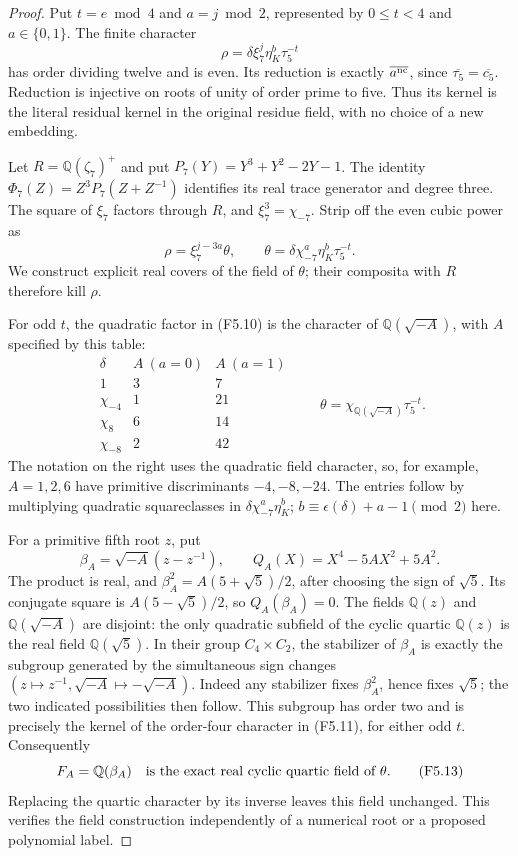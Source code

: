 \begin{proof}
Put $t=e\bmod4$ and $a=j\bmod2$, represented by
$0\leq t<4$ and $a\in\{0,1\}$. The finite character
\[
                 \rho=\delta\xi_7^j\eta_K^b\tau_5^{-t}
 \tag{F5.9}
\]
has order dividing twelve and is even. Its reduction is exactly
$\overline{a^{\rm nc}}$, since $\overline{\tau_5}=\overline{c_5}$.
Reduction is injective on roots of unity of order prime to five.
Thus its kernel is the literal residual kernel in the original
residue field, with no choice of a new embedding.

Let $R=\mathbb Q(\zeta_7)^+$ and put
$P_7(Y)=Y^3+Y^2-2Y-1$.
The identity $\Phi_7(Z)=Z^3P_7(Z+Z^{-1})$ identifies its
real trace generator and degree three. The square of $\xi_7$
factors through $R$, and $\xi_7^3=\chi_{-7}$.
Strip off the even cubic power as
\[
 \rho=\xi_7^{j-3a}\theta,\qquad
              \theta=\delta\chi_{-7}^{a}\eta_K^b\tau_5^{-t}.
 \tag{F5.10}
\]
We construct explicit real covers of the field of $\theta$;
their composita with $R$ therefore kill $\rho$.

For odd $t$, the quadratic factor in (F5.10) is the character
of $\mathbb Q(\sqrt{-A})$, with $A$ specified by this table:
\[
 \begin{array}{c|cc}
 \delta&A\ (a=0)&A\ (a=1)\\\hline
 1&3&7\\
 \chi_{-4}&1&21\\
 \chi_8&6&14\\
 \chi_{-8}&2&42
 \end{array}\qquad
                \theta=\chi_{\mathbb Q(\sqrt{-A})}\tau_5^{-t}.
 \tag{F5.11}
\]
The notation on the right uses the quadratic field character,
so, for example, $A=1,2,6$ have primitive discriminants
$-4,-8,-24$. The entries follow by multiplying quadratic
squareclasses in $\delta\chi_{-7}^a\eta_K^b$;
$b\equiv\epsilon(\delta)+a-1\pmod2$ here.

For a primitive fifth root $z$, put
\[
             \beta_A=\sqrt{-A}(z-z^{-1}),\qquad
                  Q_A(X)=X^4-5AX^2+5A^2.
 \tag{F5.12}
\]
The product is real, and
$\beta_A^2=A(5+\sqrt5)/2$, after choosing the sign of $\sqrt5$.
Its conjugate square is $A(5-\sqrt5)/2$, so $Q_A(\beta_A)=0$.
The fields $\mathbb Q(z)$ and $\mathbb Q(\sqrt{-A})$ are
disjoint: the only quadratic subfield of the cyclic quartic
$\mathbb Q(z)$ is the real field $\mathbb Q(\sqrt5)$.
In their group $C_4\times C_2$, the stabilizer of $\beta_A$
is exactly the subgroup generated by the simultaneous sign
changes $(z\mapsto z^{-1},\sqrt{-A}\mapsto-\sqrt{-A})$.
Indeed any stabilizer fixes $\beta_A^2$, hence fixes $\sqrt5$;
the two indicated possibilities then follow.
This subgroup has order two and is precisely the kernel of
the order-four character in (F5.11), for either odd $t$.
Consequently
\[
          F_A=\mathbb Q(\beta_A)
             \quad\hbox{is the exact real cyclic quartic field of }\theta.
 \tag{F5.13}
\]
Replacing the quartic character by its inverse leaves this field
unchanged. This verifies the field construction independently
of a numerical root or a proposed polynomial label.


\end{proof}
